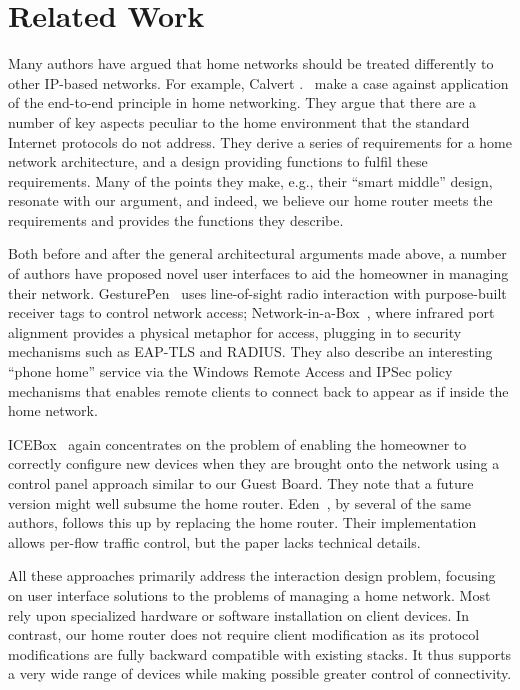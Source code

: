 \section{Related Work}
\label{s:related}
 
Many authors have argued that home networks should be treated
differently to other IP-based networks.  For example, Calvert
\etal.~\cite{calvert07:_movin_towar_middl} make a case against
application of the end-to-end principle in home networking.  They
argue that there are a number of key aspects peculiar to the home
environment that the standard Internet protocols do not address.  They
derive a series of requirements for a home network architecture, and a
design providing functions to fulfil these requirements.  Many of the
points they make, e.g., their ``smart middle'' design, resonate with
our argument, and indeed, we believe our home router meets the
requirements and provides the functions they describe.

Both before and after the general architectural arguments made above,
a number of authors have proposed novel user interfaces to aid the
homeowner in managing their network.
GesturePen~\cite{swindells02:_that} uses line-of-sight radio
interaction with purpose-built receiver tags to control network
access; Network-in-a-Box~\cite{balfanz04:_networ}, where infrared port
alignment provides a physical metaphor for access, plugging in to
security mechanisms such as EAP-TLS and RADIUS.  They also describe an
interesting ``phone home'' service via the Windows Remote Access and
IPSec policy mechanisms that enables remote clients to connect back to
appear as if inside the home network.

ICEBox~\cite{yang07:_icebox} again concentrates on the problem of
enabling the homeowner to correctly configure new devices when they
are brought onto the network using a control panel approach similar to
our Guest Board.  They note that a future version might well subsume
the home router.  Eden~\cite{yang10:_eden}, by several of the same
authors, follows this up by replacing the home router.  Their
implementation allows per-flow traffic control, but the paper lacks
technical details.

All these approaches primarily address the interaction design problem,
focusing on user interface solutions to the problems of managing a
home network.  Most rely upon specialized hardware or software
installation on client devices.  In contrast, our home router does not
require client modification as its protocol modifications are fully
backward compatible with existing stacks.  It thus supports a very
wide range of devices while making possible greater control of
connectivity.

